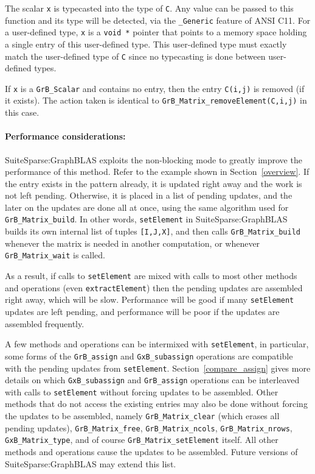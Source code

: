 \documentclass[12pt]{article}
\begin{document}
The scalar \verb'x' is typecasted into the type of \verb'C'.  Any value can be
passed to this function and its type will be detected, via the \verb'_Generic'
feature of ANSI C11.  For a user-defined type, \verb'x' is a \verb'void *'
pointer that points to a memory space holding a single entry of this
user-defined type.  This user-defined type must exactly match the user-defined
type of \verb'C' since no typecasting is done between user-defined types.

If \verb'x' is a \verb'GrB_Scalar' and contains no entry, then the
entry \verb'C(i,j)' is removed (if it exists).  The action taken is
identical to \verb'GrB_Matrix_removeElement(C,i,j)' in this case.

\paragraph{\bf Performance considerations:} %
SuiteSparse:GraphBLAS exploits the non-blocking mode to greatly improve the
performance of this method.  Refer to the example shown in
Section~\ref{overview}.  If the entry exists in the pattern already, it is
updated right away and the work is not left pending.  Otherwise, it is placed
in a list of pending updates, and the later on the updates are done all at
once, using the same algorithm used for \verb'GrB_Matrix_build'.  In other
words, \verb'setElement' in SuiteSparse:GraphBLAS builds its own internal list
of tuples \verb'[I,J,X]', and then calls \verb'GrB_Matrix_build' whenever the
matrix is needed in another computation, or whenever \verb'GrB_Matrix_wait' is
called.

As a result, if calls to \verb'setElement' are mixed with calls to most other
methods and operations (even \verb'extractElement') then the pending updates
are assembled right away, which will be slow.  Performance will be good if many
\verb'setElement' updates are left pending, and performance will be poor if the
updates are assembled frequently.

A few methods and operations can be intermixed with \verb'setElement', in
particular, some forms of the \verb'GrB_assign' and \verb'GxB_subassign'
operations are compatible with the pending updates from \verb'setElement'.
Section~\ref{compare_assign} gives more details on which \verb'GxB_subassign'
and \verb'GrB_assign' operations can be interleaved with calls to
\verb'setElement' without forcing updates to be assembled.  Other methods that
do not access the existing entries may also be done without forcing the updates
to be assembled, namely \verb'GrB_Matrix_clear' (which erases all pending
updates), \verb'GrB_Matrix_free', \verb'GrB_Matrix_ncols',
\verb'GrB_Matrix_nrows', \verb'GxB_Matrix_type', and of course
\verb'GrB_Matrix_setElement' itself.  All other methods and operations cause
the updates to be assembled.  Future versions of SuiteSparse:GraphBLAS may
extend this list.
\end{document}

